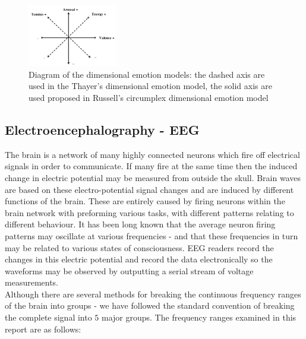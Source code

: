 \documentclass[twocolumn,superscriptaddress]{revtex4-1}
\theoremstyle{definition}
\theoremstyle{remark}
\begin{document}
\begin{figure}[h!]
  \centering
      \includegraphics[width=0.35\textwidth]{figures/emotion_model}
  \caption{\label{emotion} Diagram of the dimensional emotion models: the dashed axis are used in the Thayer's dimensional emotion model, the solid axis are used proposed in Russell's circumplex dimensional emotion model \cite{book} }
\end{figure}



\subsection{Electroencephalography - EEG}

The brain is a network of many highly connected neurons which fire off electrical signals in order to communicate. If many fire at the same time then the induced change in electric potential may be measured from outside the skull. Brain waves are based on these electro-potential signal changes and are induced by different functions of the brain. These are entirely caused by firing neurons within the brain network with preforming various tasks, with different patterns relating to different behaviour. It has been long known that the average neuron firing patterns may oscillate at various frequencies - and that these frequencies in turn may be related to various states of consciousness. EEG readers record the changes in this electric potential and record the data electronically so the waveforms may be observed by outputting a serial stream of voltage measurements. \\
Although there are several methods for breaking the continuous frequency ranges of the brain into groups - we have followed the standard convention of breaking the complete signal into $5$ major groups. The frequency ranges examined in this report are as follows:
\end{document}
